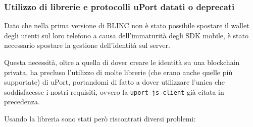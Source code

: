 \subsubsection{Utilizzo di librerie e protocolli uPort datati o deprecati}

Dato che nella prima versione di BLINC non è stato possibile spostare il wallet degli utenti sul loro telefono
a causa dell'immaturità degli SDK mobile,
è stato necessario spostare la gestione dell'identità sul server.

Questa necessità, oltre a quella di dover creare le identità su una blockchain privata, ha precluso l'utilizzo di molte
librerie (che erano anche quelle più supportate) di uPort, portandomi di fatto a dover utilizzare l'unica che soddisfacesse
i nostri requisiti, ovvero la \texttt{uport-js-client} già citata in precedenza.

Usando la libreria sono stati però riscontrati diversi problemi:

